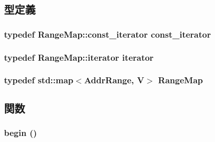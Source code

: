 \subsection{型定義}
\hypertarget{classAddrRangeMap_ab049cdad9a17cf714c462bfb9f5dbb6e}{
\subsubsection[{const\_\-iterator}]{\setlength{\rightskip}{0pt plus 5cm}typedef RangeMap::const\_\-iterator {\bf const\_\-iterator}}}
\label{classAddrRangeMap_ab049cdad9a17cf714c462bfb9f5dbb6e}
\hypertarget{classAddrRangeMap_ae61c5513b9ac04615ba7927f47c3ec69}{
\subsubsection[{iterator}]{\setlength{\rightskip}{0pt plus 5cm}typedef RangeMap::iterator {\bf iterator}}}
\label{classAddrRangeMap_ae61c5513b9ac04615ba7927f47c3ec69}
\hypertarget{classAddrRangeMap_a28cfa29c62233971dbce319cd94e24ca}{
\subsubsection[{RangeMap}]{\setlength{\rightskip}{0pt plus 5cm}typedef std::map$<${\bf AddrRange}, V$>$ {\bf RangeMap}}}
\label{classAddrRangeMap_a28cfa29c62233971dbce319cd94e24ca}


\subsection{関数}
\hypertarget{classAddrRangeMap_ad69bd11391be1a1dba5c8202259664f8}{
\subsubsection[{begin}]{ begin ()}}
\label{classAddrRangeMap_ad69bd11391be1a1dba5c8202259664f8}



